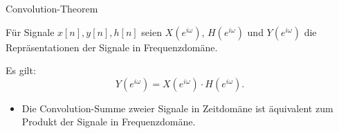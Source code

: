 
\begin{frame}[allowframebreaks]{Convolution-Theorem}

    Für Signale $x[n], y[n], h[n]$ seien $X(e^{i\omega})$, $H(e^{i\omega})$ und $Y(e^{i\omega})$ die Repräsentationen der Signale in Frequenzdomäne.  

    Es gilt:
    \begin{equation}
        Y(e^{i\omega})=X(e^{i\omega})\cdot H(e^{i\omega}).
    \end{equation}

    \begin{itemize}
        \item Die Convolution-Summe zweier Signale in Zeitdomäne ist äquivalent zum Produkt der Signale in Frequenzdomäne.
    \end{itemize}
        
\end{frame}